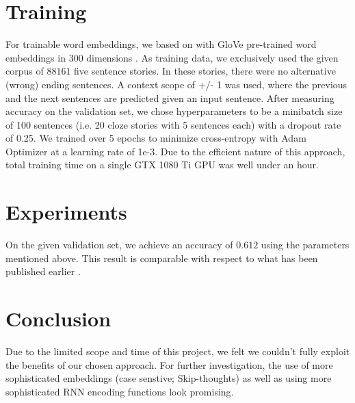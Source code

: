 \documentclass{article}
\begin{document}
\section{Training}
For trainable word embeddings, we based on with GloVe pre-trained word embeddings in 300 dimensions \cite{pennington2014glove}. 
As training data, we exclusively used the given corpus of $88161$ five sentence stories. In these stories, there were no alternative (wrong) ending sentences. 
A context scope of +/- 1  was used, where the previous and the next sentences are predicted given an input sentence.
After measuring accuracy on the validation set, we chose hyperparameters to be a minibatch size of 100 sentences (i.e. 20 cloze stories with 5 sentences each) with a dropout rate of 0.25. We trained over 5 epochs to minimize cross-entropy with Adam Optimizer at a learning rate of 1e-3.
Due to the efficient nature of this approach, total training time on a single GTX 1080 Ti GPU was well under an hour.


\section{Experiments}
On the given validation set, we achieve an accuracy of $0.612$ using the parameters mentioned above. This result is comparable with respect to what has been published earlier \cite{}.

\section{Conclusion}
Due to the limited scope and time of this project, we felt we couldn't fully exploit the benefits of our chosen approach. For further investigation, the use of more sophisticated embeddings (case senstive; Skip-thoughts) as well as using more sophisticated RNN encoding functions look promising.

%
 
\end{document}

